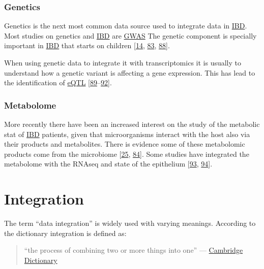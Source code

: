 \documentclass[
  12pt,
  a4paper,
  twoside,
  openright]{book}
\begin{document}
\hypertarget{genetics-1}{%
\subsubsection{Genetics}\label{genetics-1}}

Genetics is the next most common data source used to integrate data in \protect\hyperlink{acronyms_IBD}{IBD}.
Most studies on genetics and \protect\hyperlink{acronyms_IBD}{IBD} are \protect\hyperlink{acronyms_GWAS}{GWAS}
The genetic component is specially important in \protect\hyperlink{acronyms_IBD}{IBD} that starts on children {[}\protect\hyperlink{ref-kumar2019}{14}, \protect\hyperlink{ref-huWholeExomeSequencing2021}{83}, \protect\hyperlink{ref-knights2013}{88}{]}.

When using genetic data to integrate it with transcriptomics it is usually to understand how a genetic variant is affecting a gene expression.
This has lead to the identification of \protect\hyperlink{acronyms_eQTL}{eQTL} {[}\protect\hyperlink{ref-repnik2016}{89}--\protect\hyperlink{ref-dai2019}{92}{]}.

\hypertarget{metabolome}{%
\subsubsection{Metabolome}\label{metabolome}}

More recently there have been an increased interest on the study of the metabolic stat of \protect\hyperlink{acronyms_IBD}{IBD} patients, given that microorganisms interact with the host also via their products and metabolites.
There is evidence some of these metabolomic products come from the microbiome {[}\protect\hyperlink{ref-ferrer-picuxf3n2020}{25}, \protect\hyperlink{ref-mayorgas2021}{84}{]}.
Some studies have integrated the metabolome with the RNAseq and state of the epithelium {[}\protect\hyperlink{ref-ahmed2016}{93}, \protect\hyperlink{ref-gallagher2021}{94}{]}.

\hypertarget{integration}{%
\section{Integration}\label{integration}}

The term ``data integration'' is widely used with varying meanings.
According to the dictionary integration is defined as:

\begin{quote}
``the process of combining two or more things into one'' --- \href{https://dictionary.cambridge.org/dictionary/english/integration}{Cambridge Dictionary}
\end{quote}
\end{document}
